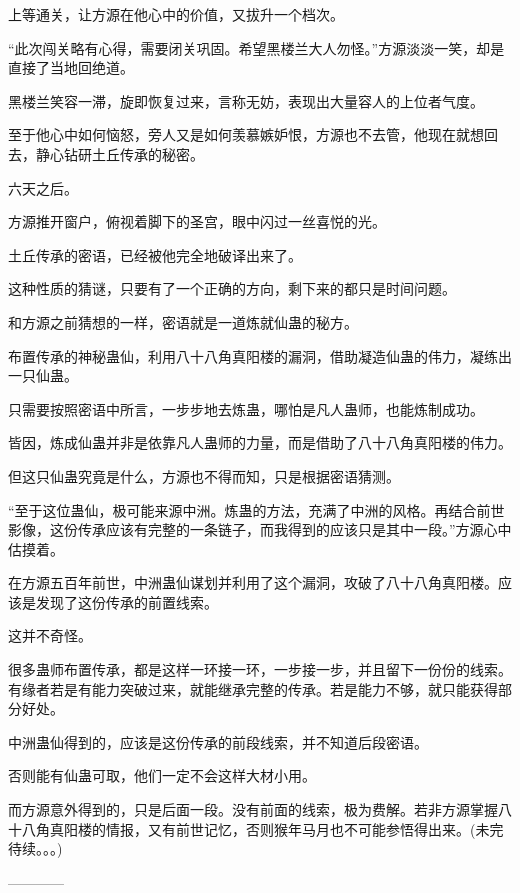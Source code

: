 \begin{this_body}
上等通关，让方源在他心中的价值，又拔升一个档次。

“此次闯关略有心得，需要闭关巩固。希望黑楼兰大人勿怪。”方源淡淡一笑，却是直接了当地回绝道。

黑楼兰笑容一滞，旋即恢复过来，言称无妨，表现出大量容人的上位者气度。

至于他心中如何恼怒，旁人又是如何羡慕嫉妒恨，方源也不去管，他现在就想回去，静心钻研土丘传承的秘密。

六天之后。

方源推开窗户，俯视着脚下的圣宫，眼中闪过一丝喜悦的光。

土丘传承的密语，已经被他完全地破译出来了。

这种性质的猜谜，只要有了一个正确的方向，剩下来的都只是时间问题。

和方源之前猜想的一样，密语就是一道炼就仙蛊的秘方。

布置传承的神秘蛊仙，利用八十八角真阳楼的漏洞，借助凝造仙蛊的伟力，凝练出一只仙蛊。

只需要按照密语中所言，一步步地去炼蛊，哪怕是凡人蛊师，也能炼制成功。

皆因，炼成仙蛊并非是依靠凡人蛊师的力量，而是借助了八十八角真阳楼的伟力。

但这只仙蛊究竟是什么，方源也不得而知，只是根据密语猜测。

“至于这位蛊仙，极可能来源中洲。炼蛊的方法，充满了中洲的风格。再结合前世影像，这份传承应该有完整的一条链子，而我得到的应该只是其中一段。”方源心中估摸着。

在方源五百年前世，中洲蛊仙谋划并利用了这个漏洞，攻破了八十八角真阳楼。应该是发现了这份传承的前置线索。

这并不奇怪。

很多蛊师布置传承，都是这样一环接一环，一步接一步，并且留下一份份的线索。有缘者若是有能力突破过来，就能继承完整的传承。若是能力不够，就只能获得部分好处。

中洲蛊仙得到的，应该是这份传承的前段线索，并不知道后段密语。

否则能有仙蛊可取，他们一定不会这样大材小用。

而方源意外得到的，只是后面一段。没有前面的线索，极为费解。若非方源掌握八十八角真阳楼的情报，又有前世记忆，否则猴年马月也不可能参悟得出来。(未完待续。。。)

------------

\end{this_body}

